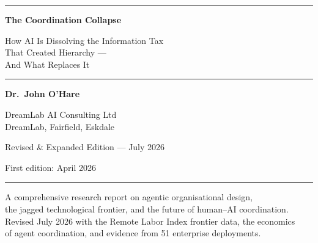 \documentclass[12pt,a4paper,openright]{book}
\begin{document}
\begin{titlepage}
\begin{center}

\vspace*{2cm}

{\color{accentgold}\rule{\textwidth}{2pt}}

\vspace{1.5cm}

{\fontsize{28}{34}\selectfont\bfseries\color{navyblue}
The Coordination Collapse}

\vspace{0.8cm}

{\fontsize{16}{20}\selectfont\color{navyblue!80!black}
How AI Is Dissolving the Information Tax\\
That Created Hierarchy ---\\
And What Replaces It}

\vspace{1.2cm}

{\color{accentgold}\rule{0.4\textwidth}{1pt}}

\vspace{1.2cm}

{\Large\bfseries Dr.\ John O'Hare}

\vspace{0.4cm}

{\large\color{navyblue!70!black}
DreamLab AI Consulting Ltd\\
DreamLab, Fairfield, Eskdale}

\vspace{1.5cm}

{\large Revised \& Expanded Edition --- July 2026}
\vspace{0.3cm}

{\small\color{navyblue!60!black}First edition: April 2026}

\vspace{2cm}

{\color{accentgold}\rule{\textwidth}{2pt}}

\vfill

{\small\color{navyblue!50!black}
A comprehensive research report on agentic organisational design,\\
the jagged technological frontier, and the future of human--AI coordination.\\[2mm]
Revised July 2026 with the Remote Labor Index frontier data, the economics\\
of agent coordination, and evidence from 51 enterprise deployments.}

\end{center}
\end{titlepage}
\end{document}
